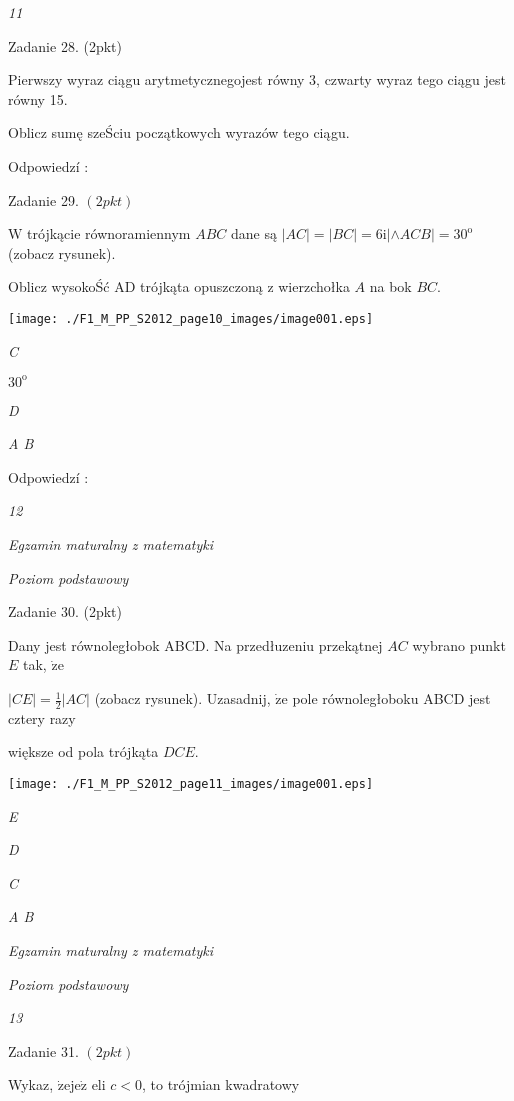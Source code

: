 \documentclass[a4paper,12pt]{article}
\begin{document}
{\it 11}

Zadanie 28. (2pkt)

Pierwszy wyraz ciągu arytmetycznegojest równy 3, czwarty wyraz tego ciągu jest równy 15.

Oblicz sumę szeŚciu początkowych wyrazów tego ciągu.

Odpowiedzí :

Zadanie 29. $(2pkt)$

$\mathrm{W}$ trójkącie równoramiennym $ABC$ dane są $|AC|=|BC|=6 \mathrm{i}|\wedge ACB|=30^{\mathrm{o}}$ (zobacz rysunek).

Oblicz wysokoŚć AD trójkąta opuszczoną z wierzchołka $A$ na bok $BC.$
\begin{center}
\texttt{[image: ./F1\_M\_PP\_S2012\_page10\_images/image001.eps]}
\end{center}
{\it C}

$30^{\mathrm{o}}$

{\it D}

{\it A B}

Odpowiedzí :





{\it 12}

{\it Egzamin maturalny z matematyki}

{\it Poziom podstawowy}

Zadanie 30. (2pkt)

Dany jest równoległobok ABCD. Na przedłuzeniu przekątnej $AC$ wybrano punkt $E$ tak, $\dot{\mathrm{z}}\mathrm{e}$

$|CE|=\displaystyle \frac{1}{2}|AC|$ (zobacz rysunek). Uzasadnij, $\dot{\mathrm{z}}\mathrm{e}$ pole równoległoboku ABCD jest cztery razy

większe od pola trójkąta $DCE.$
\begin{center}
\texttt{[image: ./F1\_M\_PP\_S2012\_page11\_images/image001.eps]}
\end{center}
{\it E}

{\it D}

{\it C}

{\it A  B}





{\it Egzamin maturalny z matematyki}

{\it Poziom podstawowy}

{\it 13}

Zadanie 31. $(2pkt)$

Wykaz, $\dot{\mathrm{z}}\mathrm{e}\mathrm{j}\mathrm{e}\dot{\mathrm{z}}$ eli $c<0$, to trójmian kwadratowy
\end{document}
